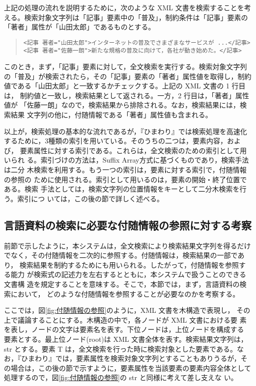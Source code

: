 上記の処理の流れを説明するために，次のような XML 文書を検索することを考
える。検索対象文字列は「記事」要素中の「普及」，制約条件は「記事」要素の
「著者」属性が「山田太郎」であるものとする。

\begin{quote}
\begin{verbatim}
<記事 著者="山田太郎">インターネットの普及でさまざまなサービスが ...</記事>
<記事 著者="佐藤一朗">新たな規格の普及に向けて，各社が動き始めた。</記事>
\end{verbatim}
\end{quote}

このとき，まず，「記事」要素に対して，全文検索を実行する。検索対象文字列
の「普及」が検索されたら，その「記事」要素の「著者」属性値を取得し，制約
値である「山田太郎」と一致するかチェックする。上記の XML 文書の 1 行目は，
制約値と一致し，検索結果として返される。一方，2 行目は，「著者」属性値が
「佐藤一朗」なので，検索結果から排除される。なお，検索結果には，検索結果
文字列の他に，付随情報である「著者」属性値も含まれる。

以上が，検索処理の基本的な流れであるが，『ひまわり』では検索処理を高速化
するために，3種類の索引を用いている。そのうちの二つは，要素内容，および，
要素属性に対する索引である。これらは，全文検索のための索引として用いられ
る。索引づけの方法は，Suffix Array方式に基づくものであり，検索手法は二分
木検索を利用する。もう一つの索引は，要素に対する索引で，付随情報の参照の
ために使用される。索引として用いるのは，要素の開始・終了位置である。検索
手法としては，検索文字列の位置情報をキーとして二分木検索を行う。索引につ
いては，この後の節で詳しく述べる。


\subsection{言語資料の検索に必要な付随情報の参照に対する考察}
前節で示したように，本システムは，全文検索により検索結果文字列を得るだけ
でなく，その付随情報を二次的に参照する。付随情報は，検索結果の一部であり，
検索結果を制約するためにも用いられる。したがって，付随情報を参照する能力
が検索式の記述力を左右するとともに，本システムで扱うことのできる文書構
造を規定することを意味する。そこで，本節では，まず，言語資料の検索において，
どのような付随情報を参照することが必要なのかを考察する。


ここでは，図\ref{fig:付随情報の参照}のように，XML 文書を木構造で表現し，
その上で議論することにする。木構造の中で，各ノードが XML 文書における要
素を表し，ノードの文字は要素名を表す。下位ノードは，上位ノードを構成する
要素とする。最上位ノード(root)は XML 文書全体を表す。検索結果文字列は，
str とする。要素 T は，全文検索を行った時に検索対象とした要素である。な
お，『ひまわり』では，要素属性を検索対象文字列とすることもありうるが，そ
の場合は，この後の節で示すように，要素属性を当該要素の要素内容全体として
処理するので，図\ref{fig:付随情報の参照}の str と同様に考えて差し支えな
い。



